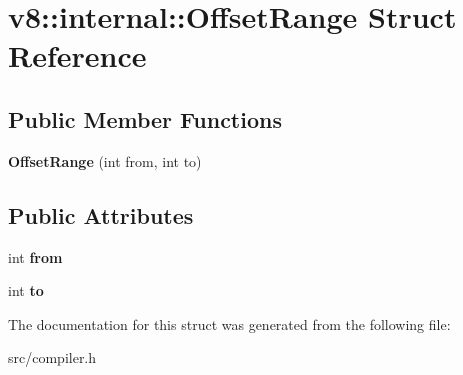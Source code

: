 \hypertarget{structv8_1_1internal_1_1_offset_range}{}\section{v8\+:\+:internal\+:\+:Offset\+Range Struct Reference}
\label{structv8_1_1internal_1_1_offset_range}
\subsection*{Public Member Functions}
\begin{DoxyCompactItemize}
\item 
\hypertarget{structv8_1_1internal_1_1_offset_range_a89dc2d4e6124032502a36f21d5f10fdb}{}{\bfseries Offset\+Range} (int from, int to)\label{structv8_1_1internal_1_1_offset_range_a89dc2d4e6124032502a36f21d5f10fdb}

\end{DoxyCompactItemize}
\subsection*{Public Attributes}
\begin{DoxyCompactItemize}
\item 
\hypertarget{structv8_1_1internal_1_1_offset_range_a3ec30cc20d5edb690763b2ec8388dd65}{}int {\bfseries from}\label{structv8_1_1internal_1_1_offset_range_a3ec30cc20d5edb690763b2ec8388dd65}

\item 
\hypertarget{structv8_1_1internal_1_1_offset_range_ae6a16b229da19c9a2f3cf2a7ebf003b5}{}int {\bfseries to}\label{structv8_1_1internal_1_1_offset_range_ae6a16b229da19c9a2f3cf2a7ebf003b5}

\end{DoxyCompactItemize}


The documentation for this struct was generated from the following file\+:\begin{DoxyCompactItemize}
\item 
src/compiler.\+h\end{DoxyCompactItemize}
